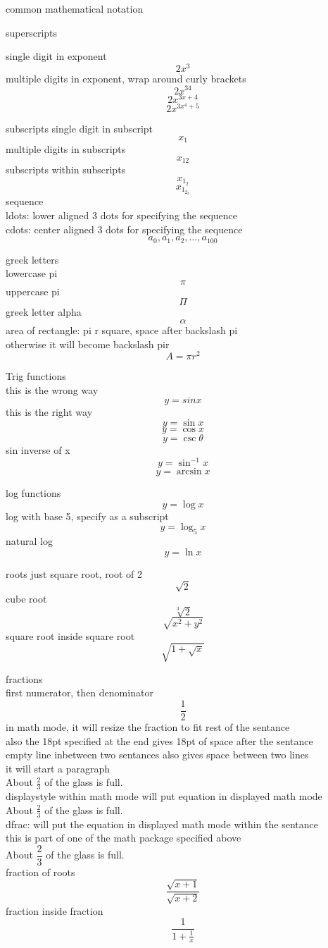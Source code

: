 \documentclass[24pt]{article}
\begin{document}
common mathematical notation

superscripts

single digit in exponent
$$2x^3$$
multiple digits in exponent, wrap around curly brackets
$$2x^{34}$$
$$2x^{3x+4}$$
$$2x^{3x^4+5}$$

subscripts
single digit in subscript
$$x_1$$
multiple digits in subscripts
$$x_{12}$$
subscripts within subscripts
$$x_{1_2}$$
$$x_{1_{2_3}}$$
sequence\\
ldots: lower aligned 3 dots for specifying the sequence\\
cdots: center aligned 3 dots for specifying the sequence\\
$$a_0, a_1, a_2, \ldots, a_{100}$$

greek letters\\
lowercase pi\\
$$\pi$$
uppercase pi\\
$$\Pi$$
greek letter alpha
$$\alpha$$
area of rectangle: pi r square, space after backslash pi\\
otherwise it will become backslash pir\\
$$A=\pi r^2$$

Trig functions\\
this is the wrong way\\
$$y=sin x$$
this is the right way\\
$$y=\sin x$$
$$y=\cos x$$
$$y=\csc \theta$$
sin inverse of x\\
$$y=\sin^{-1} x$$
$$y=\arcsin x$$

log functions
$$y=\log x$$
log with base 5, specify as a subscript\\
$$y=\log_5 x$$
natural log\\
$$y=\ln x$$

roots
just square root, root of 2\\
$$\sqrt{2}$$
cube root\\
$$\sqrt[3]{2}$$
$$\sqrt{x^2+y^2}$$
square root inside square root\\
$$\sqrt{   1+\sqrt{x}   }$$

fractions\\
first numerator, then denominator\\
$$\frac{1}{2}$$
in math mode, it will resize the fraction to fit rest of the sentance\\
also the 18pt specified at the end gives 18pt of space after the sentance\\
empty line inbetween two sentances also gives space between two lines\\
it will start a paragraph\\
About $\frac{2}{3}$ of the glass is full.\\[18pt]
displaystyle within math mode will put equation in displayed math mode\\
About $\displaystyle \frac{2}{3}$ of the glass is full.\\[10pt]
dfrac: will put the equation in displayed math mode within the sentance\\
this is part of one of the math package specified above\\
About $\dfrac{2}{3}$ of the glass is full.\\[18pt]

fraction of roots\\
$$\frac{\sqrt{x+1}}{\sqrt{x+2}}$$
fraction inside fraction\\
$$\frac{1}{1+\frac{1}{x}}$$
\end{document}
